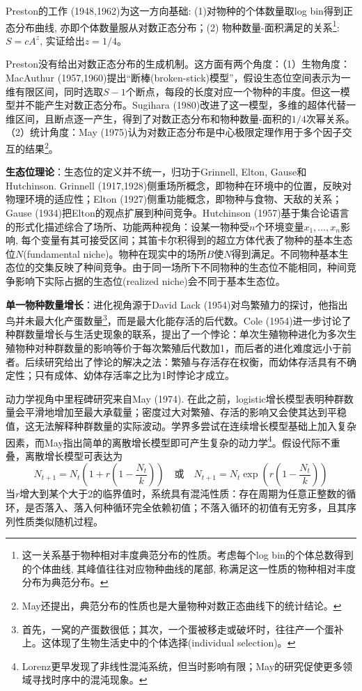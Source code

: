 Preston的工作 (1948,1962)为这一方向基础: (1)对物种的个体数量取log bin得到正态分布曲线, 亦即个体数量服从对数正态分布；(2) 物种数量-面积满足的关系\footnote{这一关系基于物种相对丰度典范分布的性质。考虑每个log bin的个体总数得到的个体曲线, 其峰值往往对应物种曲线的尾部, 称满足这一性质的物种相对丰度分布为典范分布。}: $S=c A^z$, 实证给出$z=1/4$。

Preston没有给出对数正态分布的生成机制。这方面有两个角度：（1）生物角度：MacAuthur (1957,1960)提出“断棒(broken-stick)模型”，假设生态位空间表示为一维有限区间，同时选取$S-1$个断点，每段的长度对应一个物种的丰度。但这一模型并不能产生对数正态分布。Sugihara (1980)改进了这一模型，多维的超体代替一维区间，且断点逐一产生，得到了对数正态分布和物种数量-面积的$1/4$次幂关系。（2）统计角度：May (1975)认为对数正态分布是中心极限定理作用于多个因子交互的结果\footnote{May还提出，典范分布的性质也是大量物种对数正态曲线下的统计结论。}。

\textbf{生态位理论}：生态位的定义并不统一，归功于Grinnell, Elton, Gause和Hutchinson. Grinnell (1917,1928)侧重场所概念，即物种在环境中的位置，反映对物理环境的适应性；Elton (1927)侧重功能概念，即物种与食物、天敌的关系；Gause (1934)把Elton的观点扩展到种间竞争。Hutchinson (1957)基于集合论语言的形式化描述综合了场所、功能两种视角：设某一物种受$n$个环境变量$x_1,\dots,x_n$影响, 每个变量有其可接受区间；其笛卡尔积得到的超立方体代表了物种的基本生态位$N$(fundamental niche)。物种在现实中的场所$B$使$N$得到满足。不同物种基本生态位的交集反映了种间竞争。由于同一场所下不同物种的生态位不能相同，种间竞争影响下实际占据的生态位(realized niche)会不同于基本生态位。

\textbf{单一物种数量增长}：进化视角源于David Lack (1954)对鸟繁殖力的探讨，他指出鸟并未最大化产蛋数量\footnote{首先，一窝的产蛋数很低；其次，一个蛋被移走或破坏时，往往产一个蛋补上。这体现了生物生活史中的个体选择(individual selection)。}，而是最大化能存活的后代数。Cole (1954)进一步讨论了种群数量增长与生活史现象的联系，提出了一个悖论：单次生殖物种进化为多次生殖物种对种群数量的影响等价于每次繁殖后代数加1，而后者的进化难度远小于前者。后续研究给出了悖论的解决之法：繁殖与存活存在权衡，而幼体存活具有不确定性；只有成体、幼体存活率之比为1时悖论才成立。

动力学视角中里程碑研究来自May (1974). 在此之前，logistic增长模型表明种群数量会平滑地增加至最大承载量；密度过大对繁殖、存活的影响又会使其达到平稳值，这无法解释种群数量的实际波动。学界多尝试在连续增长模型基础上加入复杂因素，而May指出简单的离散增长模型即可产生复杂的动力学\footnote{Lorenz更早发现了非线性混沌系统，但当时影响有限；May的研究促使更多领域寻找时序中的混沌现象。}。假设代际不重叠，离散增长模型可表达为
\begin{equation}
    N_{t+1} = N_t \left(1+r\left(1-\frac{N_t}{k}\right)\right) \quad \text{或} \quad  N_{t+1} = N_t \exp\left(r\left(1-\frac{N_t}{k}\right)\right) 
\end{equation}
当$r$增大到某个大于2的临界值时，系统具有混沌性质：存在周期为任意正整数的循环，是否落入、落入何种循环完全依赖初值；不落入循环的初值有无穷多，且其序列性质类似随机过程。

